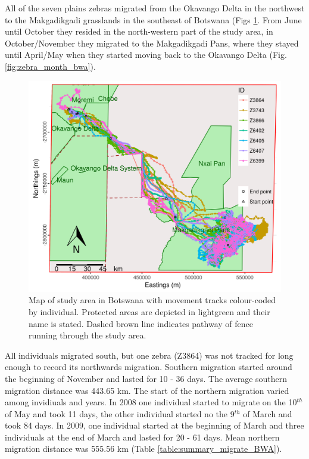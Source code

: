 \documentclass[12pt,a4paper, twoside, english]{article}
\begin{document}
All of the seven plains zebras migrated from the Okavango Delta in the northwest to the Makgadikgadi grasslands in the southeast of Botswana (Figs \ref{fig:zebra_overview_bwa}. From June until October they resided in the north-western part of the study area, in October/November they migrated to the Makgadikgadi Pans, where they stayed until April/May when they started moving back to the Okavango Delta (Fig. \ref{fig:zebra_month_bwa}).

\begin{figure}[H]
  \centering
  \includegraphics[width=\textwidth]{figures/Zebra_BWA_Overview.png}
  \caption[Ngamiland's zebra movement tracks]{Map of study area in Botswana with movement tracks colour-coded by individual. Protected areas are depicted in lightgreen and their name is stated. Dashed brown line indicates pathway of fence running through the study area.}
  \label{fig:zebra_overview_bwa}
\end{figure}

All individuals migrated south, but one zebra (Z3864) was not tracked for long enough to record its northwards migration. Southern migration started around the beginning of November and lasted for 10 - 36 days. The average southern migration distance was 443.65 km. The start of the northern migration varied among invidiuals and years. In 2008 one individual started to migrate on the 10$^{th}$ of May and took 11 days, the other individual started no the 9$^{th}$ of March and took 84 days. In 2009, one individual started at the beginning of March and three individuals at the end of March and lasted for 20 - 61 days. Mean northern migration distance was 555.56 km (Table \ref{table:summary_migrate_BWA}).
\end{document}

